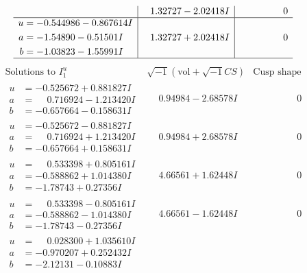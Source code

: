 \documentclass[1p]{elsarticle_modified}
\theoremstyle{definition}
\newcommand{\I}{\sqrt{-1}}
\begin{document}
$$\begin{array}{c|c|c}
 & \phantom{-}1.32727 - 2.02418 I & \phantom{-0.000000 } 0 \\ \hline\begin{aligned}
u &= -0.544986 - 0.867614 I \\
a &= -1.54890 - 0.51501 I \\
b &= -1.03823 - 1.55991 I\end{aligned}
 & \phantom{-}1.32727 + 2.02418 I & \phantom{-0.000000 } 0\\
 \hline 
 \end{array}$$\newpage$$\begin{array}{c|c|c}  
\text{Solutions to }I^u_{1}& \I (\text{vol} + \sqrt{-1}CS) & \text{Cusp shape}\\
 \hline 
\begin{aligned}
u &= -0.525672 + 0.881827 I \\
a &= \phantom{-}0.716924 - 1.213420 I \\
b &= -0.657664 - 0.158631 I\end{aligned}
 & \phantom{-}0.94984 - 2.68578 I & \phantom{-0.000000 } 0 \\ \hline\begin{aligned}
u &= -0.525672 - 0.881827 I \\
a &= \phantom{-}0.716924 + 1.213420 I \\
b &= -0.657664 + 0.158631 I\end{aligned}
 & \phantom{-}0.94984 + 2.68578 I & \phantom{-0.000000 } 0 \\ \hline\begin{aligned}
u &= \phantom{-}0.533398 + 0.805161 I \\
a &= -0.588862 + 1.014380 I \\
b &= -1.78743 + 0.27356 I\end{aligned}
 & \phantom{-}4.66561 + 1.62448 I & \phantom{-0.000000 } 0 \\ \hline\begin{aligned}
u &= \phantom{-}0.533398 - 0.805161 I \\
a &= -0.588862 - 1.014380 I \\
b &= -1.78743 - 0.27356 I\end{aligned}
 & \phantom{-}4.66561 - 1.62448 I & \phantom{-0.000000 } 0 \\ \hline\begin{aligned}
u &= \phantom{-}0.028300 + 1.035610 I \\
a &= -0.970207 + 0.252432 I \\
b &= -2.12131 - 0.10883 I\end{aligned}

\end{array}$$
\end{document}
